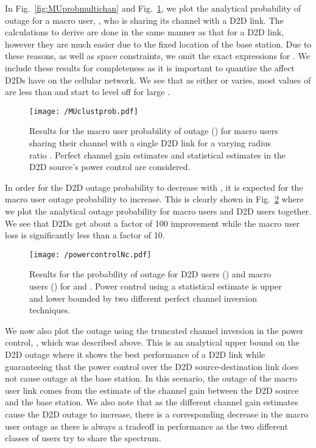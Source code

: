 \documentclass[10pt, final, journal, letterpaper,oneside, twocolumn]{IEEEtran}
\begin{document}
In Fig.~\ref{fig:MUprobmultichan} and Fig.~\ref{fig:MUclustprob}, we plot the analytical probability of outage for a macro user, , who is sharing its channel with a D2D link.  The calculations to derive  are done in the same manner as that for a D2D link, however they are much easier due to the fixed location of the base station.  Due to these reasons, as well as space constraints, we omit the exact expressions for .  We include these results for completeness as it is important to quantize the affect D2Ds have on the cellular network.  We see that as either  or  varies, most values of  are less than  and start to level off for large .  
\begin{figure}[htp]
\center
 \texttt{[image: /MUclustprob.pdf]}
  \caption[]{Results for the macro user probability of outage () for  macro users sharing their channel with a single D2D link for a varying radius ratio . Perfect channel gain estimates and statistical estimates in the D2D source's power control are considered. }
  \label{fig:MUclustprob}
\end{figure}
In order for the D2D outage probability to decrease with , it is expected for the macro user outage probability to increase.  This is clearly shown in Fig.~\ref{fig:truncatedPC} where we plot the analytical outage probability for macro users and D2D users together.  We see that D2Ds get about a factor of 100 improvement while the macro user loss is significantly less than a factor of 10.  
\begin{figure}[htp]
\center
 \texttt{[image: /powercontrolNc.pdf]}
  \caption[]{Results for the probability of outage for D2D users () and macro users () for  and .  Power control using a statistical estimate is upper and lower bounded by two different perfect channel inversion techniques. }
  \label{fig:truncatedPC}
\end{figure}
We now also plot the outage using the truncated channel inversion in the power control, , which was described above.  This is an analytical upper bound on the D2D outage where it shows the best performance of a D2D link while guaranteeing that the power control over the D2D source-destination link does not cause outage at the base station.  In this scenario, the outage of the macro user link comes from the estimate of the channel gain between the D2D source and the base station.  We also note that as the different channel gain estimates cause the D2D outage to increase, there is a corresponding decrease in the macro user outage as there is always a tradeoff in performance as the two different classes of users try to share the spectrum.  
\end{document}
